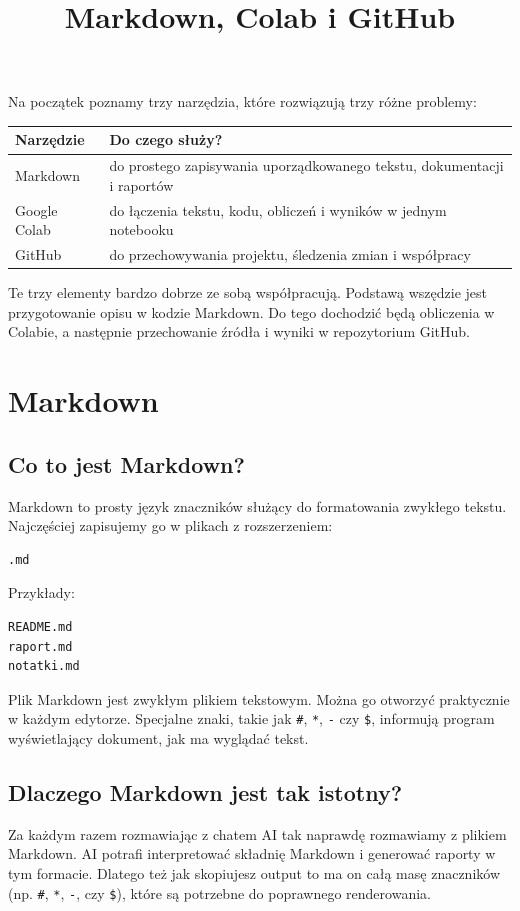 \documentclass[11pt, a4paper]{article}
\title{Markdown, Colab i GitHub}
\author{}
\date{}
\begin{document}
\maketitle

Na początek poznamy trzy narzędzia, które rozwiązują trzy różne problemy:

\begin{center}
\begin{tabular}{|l|p{10cm}|}
\hline
\textbf{Narzędzie} & \textbf{Do czego służy?} \\ \hline
Markdown & do prostego zapisywania uporządkowanego tekstu, dokumentacji i raportów \\ \hline
Google Colab & do łączenia tekstu, kodu, obliczeń i wyników w jednym notebooku \\ \hline
GitHub & do przechowywania projektu, śledzenia zmian i współpracy \\ \hline
\end{tabular}
\end{center}

Te trzy elementy bardzo dobrze ze sobą współpracują. Podstawą wszędzie jest przygotowanie opisu w kodzie Markdown. Do tego dochodzić będą obliczenia w Colabie, a następnie przechowanie źródła i wyniki w repozytorium GitHub.

\hrulefill

\section{Markdown}

\subsection{Co to jest Markdown?}
Markdown to prosty język znaczników służący do formatowania zwykłego tekstu. Najczęściej zapisujemy go w plikach z rozszerzeniem:
\begin{lstlisting}
.md
\end{lstlisting}

Przykłady:
\begin{lstlisting}
README.md
raport.md
notatki.md
\end{lstlisting}

Plik Markdown jest zwykłym plikiem tekstowym. Można go otworzyć praktycznie w każdym edytorze. Specjalne znaki, takie jak \texttt{\#}, \texttt{*}, \texttt{-} czy \texttt{\$}, informują program wyświetlający dokument, jak ma wyglądać tekst.

\subsection{Dlaczego Markdown jest tak istotny?}
Za każdym razem rozmawiając z chatem AI tak naprawdę rozmawiamy z plikiem Markdown. AI potrafi interpretować składnię Markdown i generować raporty w tym formacie. Dlatego też jak skopiujesz output to ma on całą masę znaczników (np. \texttt{\#}, \texttt{*}, \texttt{-}, czy \texttt{\$}), które są potrzebne do poprawnego renderowania.
\end{document}
